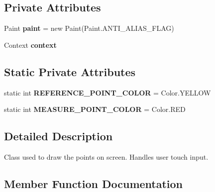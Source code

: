 \subsection*{Private Attributes}
\begin{DoxyCompactItemize}
\item 
\mbox{\label{classcom_1_1goncalojoaocorreia_1_1cameraruler_1_1_draw_view_a01b2f91bddf3ae611d0adbad9fbe2a5c}} 
Paint {\bfseries paint} = new Paint(Paint.\+A\+N\+T\+I\+\_\+\+A\+L\+I\+A\+S\+\_\+\+F\+L\+AG)
\item 
\mbox{\label{classcom_1_1goncalojoaocorreia_1_1cameraruler_1_1_draw_view_a5d614c5f7683e201f1fa271619be1170}} 
Context {\bfseries context}
\end{DoxyCompactItemize}
\subsection*{Static Private Attributes}
\begin{DoxyCompactItemize}
\item 
\mbox{\label{classcom_1_1goncalojoaocorreia_1_1cameraruler_1_1_draw_view_a9c43391979c538ef57ca7b8b99b10450}} 
static int {\bfseries R\+E\+F\+E\+R\+E\+N\+C\+E\+\_\+\+P\+O\+I\+N\+T\+\_\+\+C\+O\+L\+OR} = Color.\+Y\+E\+L\+L\+OW
\item 
\mbox{\label{classcom_1_1goncalojoaocorreia_1_1cameraruler_1_1_draw_view_ae7aae914e8b029d63e0033f80d176065}} 
static int {\bfseries M\+E\+A\+S\+U\+R\+E\+\_\+\+P\+O\+I\+N\+T\+\_\+\+C\+O\+L\+OR} = Color.\+R\+ED
\end{DoxyCompactItemize}


\subsection{Detailed Description}
Class used to draw the points on screen. Handles user touch input. 

\subsection{Member Function Documentation}
\mbox{\label{classcom_1_1goncalojoaocorreia_1_1cameraruler_1_1_draw_view_a454612ac5caa9f18d54f28222e807468}} 

